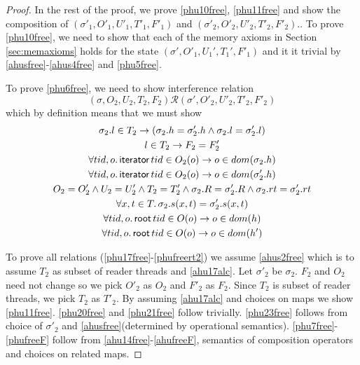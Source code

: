 \begin{proof}
In the rest of the proof, we prove \ref{phu10free}, \ref{phu11free} and show the composition of $(\sigma'_1, O'_1, U'_1,T'_1,F'_1)$ and  $(\sigma'_2, O'_2, U'_2,T'_2,F'_2)$.. To prove \ref{phu10free}, we need to show that each of the memory axioms in Section \ref{sec:memaxioms} holds for the state $(\sigma',O'_1,U_1',T_1',F'_1)$ and it it trivial by \ref{ahusfree}-\ref{ahus4free} and \ref{phu5free}.

To prove \ref{phu6free}, we need to show interference relation
\[(\sigma, O_2, U_2, T_2,F_2) \mathcal{R} (\sigma', O'_2, U'_2, T'_2,F'_2)  \]
which by definition means that we must show 
\begin{gather}\label{phu17free}
  \sigma_2.l  \in  T_2 \rightarrow (\sigma_2.h =\sigma'_2.h \land \sigma_2.l=\sigma'_2.l)\\
  \label{phu18free}
  l\in T_2\rightarrow F_2=F_2'\\
  \label{phu20free}
  \forall tid,o\ldotp\textsf{iterator} \, tid \in O_2(o) \rightarrow o \in dom(\sigma_2.h) \\
  \label{phu21free}
  \forall tid,o\ldotp\textsf{iterator} \, tid \in O_2(o) \rightarrow o \in dom(\sigma'_2.h) \\
  \label{phu22free}
  O_2 = O_2' \land U_2 = U_2' \land T_2 = T_2'\land \sigma_2.R = \sigma'_2.R \land \sigma_2.rt = \sigma'_2.rt \\
  \label{phu23free}
  \forall x, t \in T \ldotp \sigma_2.s(x,t) = \sigma'_2.s(x,t) \\
    \label{phufreert1}
  \forall tid,o\ldotp\textsf{root} \, tid \in O(o) \rightarrow o \in dom(h) \\
  \label{phufreert2}
  \forall tid,o\ldotp\textsf{root} \, tid \in O(o) \rightarrow o \in dom(h') 
\end{gather}

To prove all relations (\ref{phu17free}-\ref{phufreert2}) we assume \ref{ahus2free} which is to assume $T_2$ as subset of reader threads and \ref{ahu17alc}. Let $\sigma'_2$ be $\sigma_2$. $F_2$ and $O_2$ need not change so we pick $O'_2$  as $O_2$ and $F'_2$ as $F_2$. Since $T_2$ is subset of reader threads, we pick $T_2$ as  $T'_2$. By assuming \ref{ahu17alc} and choices on maps we show \ref{phu11free}. \ref{phu20free} and \ref{phu21free} follow trivially. \ref{phu23free} follows from choice of $\sigma'_2$ and \ref{ahusfree}(determined by operational semantics). \ref{phu7free}-\ref{phufreeF} follow from \ref{ahu14free}-\ref{ahufreeF}, semantics of composition operators and choices on related maps.


\end{proof}
